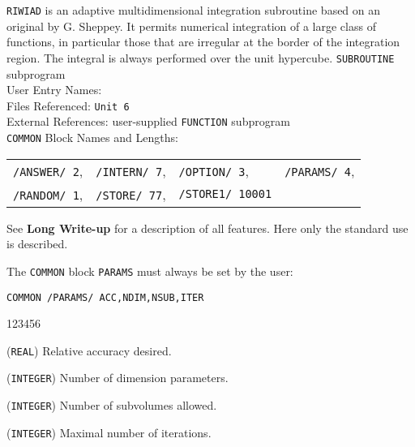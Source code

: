                      
                  
\Submitter{}                         
                     
\begin{center}
\end{center}
{\tt RIWIAD} is an adaptive multidimensional integration subroutine
based on an original by G. Sheppey. It permits numerical integration
of a large class of functions, in particular those that are irregular
at the border of the integration region. The integral is always
performed over the unit hypercube.
\Structure
{\tt SUBROUTINE} subprogram\\
User Entry Names: \\
Files Referenced: {\tt Unit 6}\\
External References: 
user-supplied {\tt FUNCTION} subprogram \\
{\tt COMMON} Block Names and Lengths:
    \begin{tabular}[t]{@{}llll}
        \texttt{/ANSWER/ 2},   &\texttt{/INTERN/ 7},&
          \texttt {/OPTION/ 3},  &\texttt{/PARAMS/ 4}, \\
        \texttt{/RANDOM/ 1},   &\texttt{/STORE/ 77},&
           \texttt{/STORE1/ 10001}
    \end{tabular}
\Usage
See {\bf Long Write-up} for a description of all features.
Here only the standard use is described.
\par
The {\tt COMMON} block {\tt PARAMS} must always
be set by the user:
\begin{center}
{\tt COMMON /PARAMS/ ACC,NDIM,NSUB,ITER}
\end{center}
\begin{DLtt}{123456}
\item [ACC] ({\tt REAL}) Relative accuracy desired.
\item [NDIM] ({\tt INTEGER}) Number of dimension parameters.
\item [NSUB] ({\tt INTEGER}) Number of subvolumes allowed.
\item [ITER] ({\tt INTEGER}) Maximal number of iterations.
\end{DLtt}
